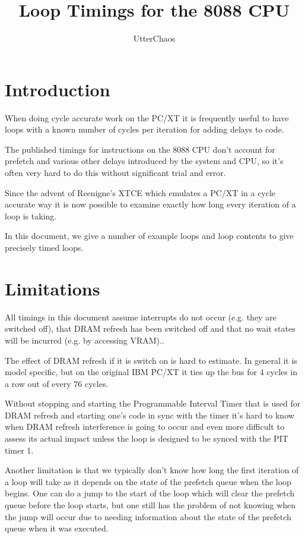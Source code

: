 \documentclass[a4paper,10pt]{amsart}
\title{Loop Timings for the 8088 CPU}
\author{UtterChaos}
\begin{document}
\maketitle

\section{Introduction}

When doing cycle accurate work on the PC/XT it is frequently useful to have
loops with a known number of cycles per iteration for adding delays to code.

The published timings for instructions on the 8088 CPU don't account for
prefetch and various other delays introduced by the system and CPU, so it's
often very hard to do this without significant trial and error.

Since the advent of Reenigne's XTCE which emulates a PC/XT in a cycle
accurate way it is now possible to examine exactly how long every iteration
of a loop is taking.

In this document, we give a number of example loops and loop contents to
give precisely timed loops.

\section{Limitations}

All timings in this document assume interrupts do not occur (e.g. they are
switched off), that DRAM refresh has been switched off and that no wait
states will be incurred (e.g. by accessing VRAM)..

The effect of DRAM refresh if it is switch on is hard to estimate. In general
it is model specific, but on the original IBM PC/XT it ties up the bus for 4
cycles in a row out of every 76 cycles.

Without stopping and starting the Programmable Interval Timer that is used
for DRAM refresh and starting one's code in sync with the timer it's hard to
know when DRAM refresh interference is going to occur and even more difficult
to assess its actual impact unless the loop is designed to be synced with the
PIT timer 1.

Another limitation is that we typically don't know how long the first
iteration of a loop will take as it depends on the state of the prefetch
queue when the loop begins. One can do a jump to the start of the loop
which will clear the prefetch queue before the loop starts, but one still
has the problem of not knowing when the jump will occur due to needing
information about the state of the prefetch queue when it was executed.
\end{document}
